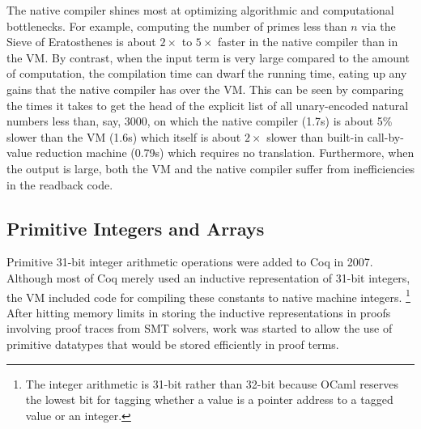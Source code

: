 The native compiler shines most at optimizing algorithmic and computational bottlenecks.
For example, computing the number of primes less than $n$ via the Sieve of Eratosthenes is about $2\times$ to $5\times$ faster in the native compiler than in the VM.
By contrast, when the input term is very large compared to the amount of computation, the compilation time can dwarf the running time, eating up any gains that the native compiler has over the VM.
This can be seen by comparing the times it takes to get the head of the explicit list of all unary-encoded natural numbers less than, say, 3000, on which the native compiler (1.7s) is about 5\% slower than the VM (1.6s) which itself is about $2\times$ slower than built-in call-by-value reduction machine (0.79s) which requires no translation.
Furthermore, when the output is large, both the VM and the native compiler suffer from inefficiencies in the readback code.



\subsection{Primitive Integers and Arrays}\label{sec:prim-ints-arrays}
Primitive 31-bit integer arithmetic operations were added to Coq in 2007.~\cite{coq-commit-int31,Extending2010Armand}
Although most of Coq merely used an inductive representation of 31-bit integers, the VM included code for compiling these constants to native machine integers.%
\footnote{%
  The integer arithmetic is 31-bit rather than 32-bit because OCaml reserves the lowest bit for tagging whether a value is a pointer address to a tagged value or an integer.%
}
After hitting memory limits in storing the inductive representations in proofs involving proof traces from SMT solvers, work was started to allow the use of primitive datatypes that would be stored efficiently in proof terms.~\cite{denes2013prim-ints-arrays}

